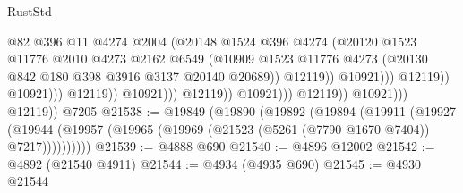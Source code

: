 \begin{lexlean}{RustStd}
\begin{coremodule}
                                                      @82
                                                      @396
                                                      @11
                                                      @4274
                                                      @2004
                                                      (@20148
                                                        @1524
                                                        @396
                                                        @4274
                                                        (@20120
                                                          @1523
                                                          @11776
                                                          @2010
                                                          @4273
                                                          @2162
                                                          @6549
                                                          (@10909
                                                            @1523
                                                            @11776
                                                            @4273
                                                            (@20130
                                                              @842
                                                              @180
                                                              @398
                                                              @3916
                                                              @3137
                                                              @20140
                                                              @20689))
                                                          @12119))
                                                      @10921)))
                                                @12119))
                                            @10921)))
                                      @12119))
                                  @10921)))
                            @12119))
                        @10921)))
                  @12119))
              @10921)))
        @12119))
    @7205
@21538 := @19849
    (@19890
      (@19892
        (@19894
          (@19911
            (@19927
              (@19944 (@19957 (@19965 (@19969 (@21523 (@5261 (@7790 @1670 @7404)) @7217))))))))))
@21539 := @4888 @690
@21540 := @4896 @12002
@21542 := @4892 (@21540 @4911)
@21544 := @4934 (@4935 @690)
@21545 := @4930 @21544

\end{coremodule}
\end{lexlean}
